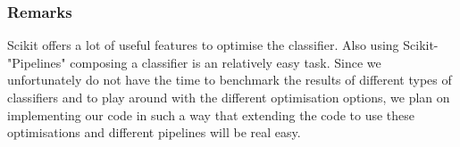 \subsubsection{Remarks}
Scikit offers a lot of useful features to optimise the classifier. Also using Scikit-"Pipelines" composing a classifier is an relatively easy task. Since we unfortunately do not have the time to benchmark the results of different types of classifiers and to play around with the different optimisation options, we plan on implementing our code in such a way that extending the code to use these optimisations and different pipelines will be real easy.